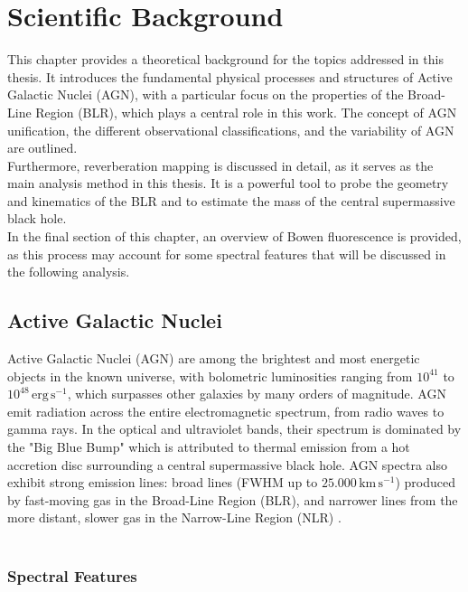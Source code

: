 \chapter{Scientific Background}
This chapter provides a theoretical background for the topics addressed in this thesis.
It introduces the fundamental physical processes and structures of Active Galactic Nuclei (AGN), with a particular focus on the properties of the Broad-Line Region (BLR), which plays a central role in this work. The concept of AGN unification, the different observational classifications, and the variability of AGN are outlined.\\
Furthermore, reverberation mapping is discussed in detail, as it serves as the main analysis method in this thesis. It is a powerful tool to probe the geometry and kinematics of the BLR and to estimate the mass of the central supermassive black hole.\\
In the final section of this chapter, an overview of Bowen fluorescence is provided, as this process may account for some spectral features that will be discussed in the following analysis.

\section{Active Galactic Nuclei}

Active Galactic Nuclei (AGN) are among the brightest and most energetic objects in the known universe, with bolometric luminosities ranging from $10^{41}$ to $10^{48}\,\mathrm{erg\,s^{-1}}$, which surpasses other galaxies by many orders of magnitude. AGN emit radiation across the entire electromagnetic spectrum, from radio waves to gamma rays. In the optical and ultraviolet bands, their spectrum is dominated by the "Big Blue Bump" which is attributed to thermal emission from a hot accretion disc surrounding a central supermassive black hole. AGN spectra also exhibit strong emission lines: broad lines (FWHM up to $25.000\,\mathrm{km\,s^{-1}}$) produced by fast-moving gas in the Broad-Line Region (BLR), and narrower lines from the more distant, slower gas in the Narrow-Line Region (NLR) \parencite{peterson1997introduction}.\\\\

\subsection{Spectral Features}

